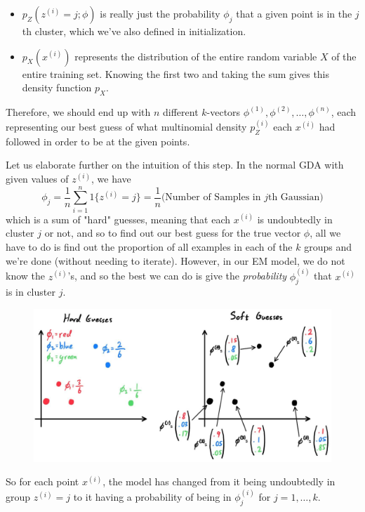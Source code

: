 \begin{definition}[EM Algorithm]
\begin{enumerate}
\begin{itemize}
              \item $p_Z(z^{(i)} = j; \phi)$ is really just the probability $\phi_j$ that a given point is in the $j$th cluster, which we've also defined in initialization.
              \item $p_X(x^{(i)})$ represents the distribution of the entire random variable $X$ of the entire training set. Knowing the first two and taking the sum gives this density function $p_X$.
          \end{itemize}
          Therefore, we should end up with $n$ different $k$-vectors $\phi^{(1)}, \phi^{(2)}, \ldots, \phi^{(n)}$, each representing our best guess of what multinomial density $p_Z^{(i)}$ each $x^{(i)}$ had followed in order to be at the given points.

          Let us elaborate further on the intuition of this step. In the normal GDA with given values of $z^{(i)}$, we have
          \[\phi_j = \frac{1}{n} \sum_{i=1}^n 1\{z^{(i)} = j\} = \frac{1}{n}\big(\text{Number of Samples in }j\text{th Gaussian}\big)\]
          which is a sum of "hard" guesses, meaning that each $x^{(i)}$ is undoubtedly in cluster $j$ or not, and so to find out our best guess for the true vector $\phi$, all we have to do is find out the proportion of all examples in each of the $k$ groups and we're done (without needing to iterate). However, in our EM model, we do not know the $z^{(i)}$'s, and so the best we can do is give the \textit{probability} $\phi^{(i)}_j$ that $x^{(i)}$ is in cluster $j$.

          \begin{figure}[H]
            \centering 
            \includegraphics[scale=0.27]{img/hard_soft_guess.jpg}
            \caption{} 
            \label{fig:hard_soft_guess}
          \end{figure}

          So for each point $x^{(i)}$, the model has changed from it being undoubtedly in group $z^{(i)} = j$ to it having a probability of being in $\phi^{(i)}_j$ for $j = 1, \ldots, k$.


\end{enumerate}
\end{definition}
